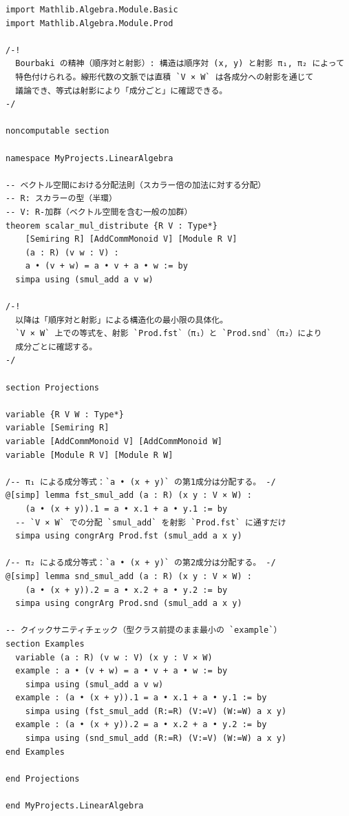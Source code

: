 \documentclass[12pt]{article}
\theoremstyle{definition}
\begin{document}
\begin{lstlisting}
import Mathlib.Algebra.Module.Basic
import Mathlib.Algebra.Module.Prod

/-!
  Bourbaki の精神（順序対と射影）: 構造は順序対 (x, y) と射影 π₁, π₂ によって
  特色付けられる。線形代数の文脈では直積 `V × W` は各成分への射影を通じて
  議論でき、等式は射影により「成分ごと」に確認できる。
-/

noncomputable section

namespace MyProjects.LinearAlgebra

-- ベクトル空間における分配法則（スカラー倍の加法に対する分配）
-- R: スカラーの型（半環）
-- V: R-加群（ベクトル空間を含む一般の加群）
theorem scalar_mul_distribute {R V : Type*}
    [Semiring R] [AddCommMonoid V] [Module R V]
    (a : R) (v w : V) :
    a • (v + w) = a • v + a • w := by
  simpa using (smul_add a v w)

/-!
  以降は「順序対と射影」による構造化の最小限の具体化。
  `V × W` 上での等式を、射影 `Prod.fst`（π₁）と `Prod.snd`（π₂）により
  成分ごとに確認する。
-/

section Projections

variable {R V W : Type*}
variable [Semiring R]
variable [AddCommMonoid V] [AddCommMonoid W]
variable [Module R V] [Module R W]

/-- π₁ による成分等式：`a • (x + y)` の第1成分は分配する。 -/
@[simp] lemma fst_smul_add (a : R) (x y : V × W) :
    (a • (x + y)).1 = a • x.1 + a • y.1 := by
  -- `V × W` での分配 `smul_add` を射影 `Prod.fst` に通すだけ
  simpa using congrArg Prod.fst (smul_add a x y)

/-- π₂ による成分等式：`a • (x + y)` の第2成分は分配する。 -/
@[simp] lemma snd_smul_add (a : R) (x y : V × W) :
    (a • (x + y)).2 = a • x.2 + a • y.2 := by
  simpa using congrArg Prod.snd (smul_add a x y)

-- クイックサニティチェック（型クラス前提のまま最小の `example`）
section Examples
  variable (a : R) (v w : V) (x y : V × W)
  example : a • (v + w) = a • v + a • w := by
    simpa using (smul_add a v w)
  example : (a • (x + y)).1 = a • x.1 + a • y.1 := by
    simpa using (fst_smul_add (R:=R) (V:=V) (W:=W) a x y)
  example : (a • (x + y)).2 = a • x.2 + a • y.2 := by
    simpa using (snd_smul_add (R:=R) (V:=V) (W:=W) a x y)
end Examples

end Projections

end MyProjects.LinearAlgebra

\end{lstlisting}
\end{document}
